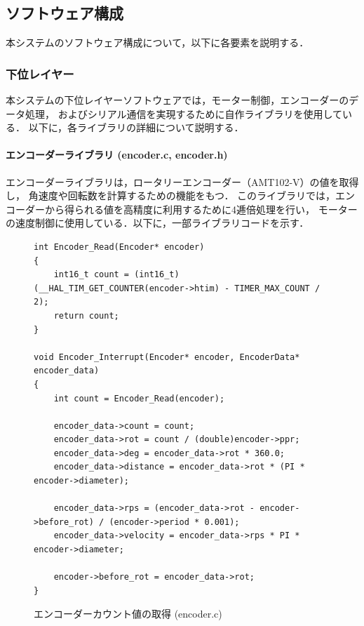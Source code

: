 \subsection{ソフトウェア構成}
本システムのソフトウェア構成について，以下に各要素を説明する．

\subsubsection{下位レイヤー}
本システムの下位レイヤーソフトウェアでは，モーター制御，エンコーダーのデータ処理，
およびシリアル通信を実現するために自作ライブラリを使用している．
以下に，各ライブラリの詳細について説明する．

\paragraph{エンコーダーライブラリ (encoder.c, encoder.h)}
エンコーダーライブラリは，ロータリーエンコーダー（AMT102-V）の値を取得し，
角速度や回転数を計算するための機能をもつ．
このライブラリでは，エンコーダーから得られる値を高精度に利用するために4逓倍処理を行い，
モーターの速度制御に使用している．以下に，一部ライブラリコードを示す．

\lstset{language=C}
\begin{figure}[H]
    \centering
    \begin{lstlisting}
int Encoder_Read(Encoder* encoder)
{
    int16_t count = (int16_t)(__HAL_TIM_GET_COUNTER(encoder->htim) - TIMER_MAX_COUNT / 2);
    return count;
}
        
void Encoder_Interrupt(Encoder* encoder, EncoderData* encoder_data)
{
    int count = Encoder_Read(encoder);
        
    encoder_data->count = count;
    encoder_data->rot = count / (double)encoder->ppr;
    encoder_data->deg = encoder_data->rot * 360.0;
    encoder_data->distance = encoder_data->rot * (PI * encoder->diameter);
        
    encoder_data->rps = (encoder_data->rot - encoder->before_rot) / (encoder->period * 0.001);
    encoder_data->velocity = encoder_data->rps * PI * encoder->diameter;
        
    encoder->before_rot = encoder_data->rot;
}
    \end{lstlisting}
    \caption{エンコーダーカウント値の取得 (encoder.c)}
    \label{lst:encoder_count}
\end{figure}

